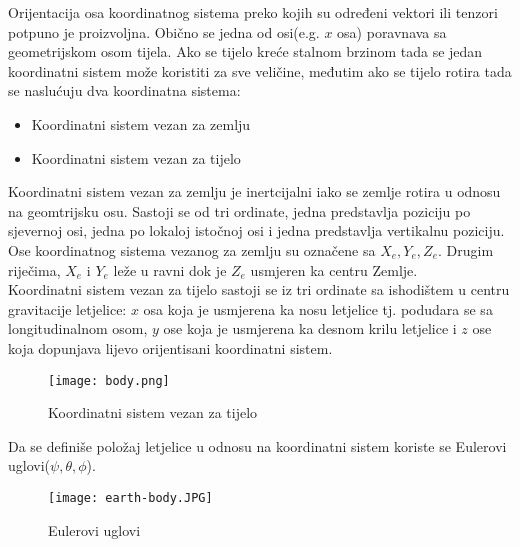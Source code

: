 Orijentacija osa koordinatnog sistema preko kojih su određeni 
vektori ili tenzori potpuno je proizvoljna. Obično se jedna od osi(e.g. $x$ osa) poravnava 
sa geometrijskom osom tijela. 
Ako se tijelo kreće stalnom brzinom tada se jedan koordinatni sistem može 
koristiti za sve veličine, međutim ako se tijelo rotira tada se naslućuju dva koordinatna sistema:
\begin{itemize}
    \item Koordinatni sistem vezan za zemlju
    \item Koordinatni sistem vezan za tijelo
\end{itemize}

Koordinatni sistem vezan za zemlju je inertcijalni iako se zemlje rotira u odnosu na geomtrijsku osu.
Sastoji se od tri ordinate, jedna predstavlja poziciju po sjevernoj osi, jedna po lokaloj istočnoj osi 
i jedna predstavlja vertikalnu poziciju. Ose koordinatnog sistema vezanog za zemlju su 
označene sa $X_e, Y_e, Z_e$. Drugim riječima, $X_e$ i $Y_e$ leže u ravni dok je $Z_e$ usmjeren ka centru Zemlje.\\
Koordinatni sistem vezan za tijelo sastoji se iz tri ordinate sa ishodištem u centru gravitacije letjelice: $x$ osa koja je
usmjerena ka nosu letjelice tj. podudara se sa longitudinalnom osom, $y$ ose koja je usmjerena ka desnom krilu letjelice i $z$ ose koja dopunjava lijevo orijentisani 
koordinatni sistem.
\begin{figure}[h!]
    \centering
    \texttt{[image: body.png]}
    \caption{Koordinatni sistem vezan za tijelo}
\end{figure}

Da se definiše položaj letjelice u odnosu na koordinatni sistem koriste se Eulerovi uglovi($\psi, \theta, \phi$).

\begin{figure}[h!]
    \centering
    \texttt{[image: earth-body.JPG]}
    \caption{Eulerovi uglovi}
\end{figure}



